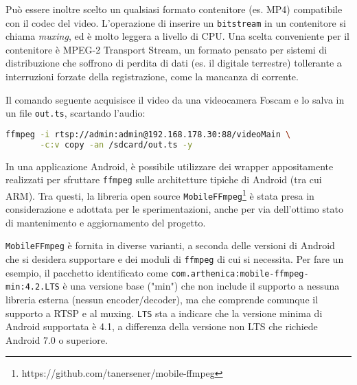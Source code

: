 Può essere inoltre scelto un qualsiasi formato contenitore (es. MP4) compatibile con il codec del video. L'operazione di inserire un \texttt{bitstream} in un contenitore si chiama \emph{muxing}, ed è molto leggera a livello di CPU. Una scelta conveniente per il contenitore è MPEG-2 Transport Stream, un formato pensato per sistemi di distribuzione che soffrono di perdita di dati (es. il digitale terrestre) tollerante a interruzioni forzate della registrazione, come la mancanza di corrente.

Il comando seguente acquisisce il video da una videocamera Foscam e lo salva in un file \texttt{out.ts}, scartando l'audio:

\begin{lstlisting}[language=bash]
ffmpeg -i rtsp://admin:admin@192.168.178.30:88/videoMain \
       -c:v copy -an /sdcard/out.ts -y
\end{lstlisting}

In una applicazione Android, è possibile utilizzare dei wrapper appositamente realizzati per sfruttare \texttt{ffmpeg} sulle architetture tipiche di Android (tra cui ARM). Tra questi, la libreria open source \texttt{MobileFFmpeg}\footnote{https://github.com/tanersener/mobile-ffmpeg} è stata presa in considerazione e adottata per le sperimentazioni, anche per via dell'ottimo stato di mantenimento e aggiornamento del progetto.

\texttt{MobileFFmpeg} è fornita in diverse varianti, a seconda delle versioni di Android che si desidera supportare e dei moduli di \texttt{ffmpeg} di cui si necessita. Per fare un esempio, il pacchetto identificato come \texttt{com.arthenica:mobile-ffmpeg-min:4.2.LTS} è una versione base ("min") che non include il supporto a nessuna libreria esterna (nessun encoder/decoder), ma che comprende comunque il supporto a RTSP e al muxing. \texttt{LTS} sta a indicare che la versione minima di Android supportata è 4.1, a differenza della versione non LTS che richiede Android 7.0 o superiore.

